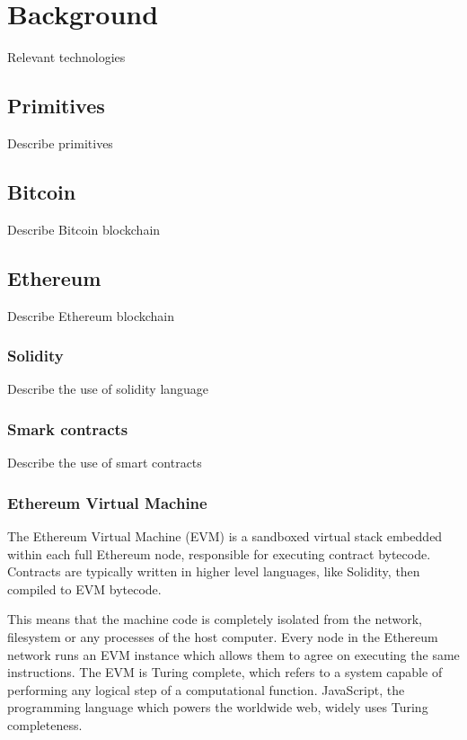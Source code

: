 \section{Background}

Relevant technologies

\subsection{Primitives}

Describe primitives

\subsection{Bitcoin}

Describe Bitcoin blockchain

\subsection{Ethereum}

Describe Ethereum blockchain

\subsubsection{Solidity}

Describe the use of solidity language

\subsubsection{Smark contracts}

Describe the use of smart contracts

\subsubsection{Ethereum Virtual Machine}

The Ethereum Virtual Machine (EVM) is a sandboxed virtual stack
embedded within each full Ethereum node, responsible for executing
contract bytecode. Contracts are typically written in higher level
languages, like Solidity, then compiled to EVM bytecode.

This means that the machine code is completely isolated from the
network, filesystem or any processes of the host computer. Every node
in the Ethereum network runs an EVM instance which allows them to
agree on executing the same instructions. The EVM is Turing complete,
which refers to a system capable of performing any logical step of a
computational function. JavaScript, the programming language which
powers the worldwide web, widely uses Turing completeness.

